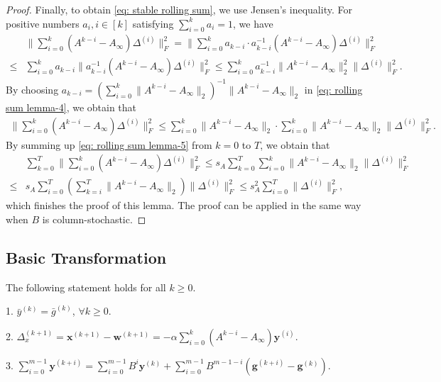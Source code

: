 \documentclass{article}
\newcommand{\vg}{{\mathbf{g}}}
\newcommand{\vw}{{\mathbf{w}}}
\newcommand{\vx}{{\mathbf{x}}}
\newcommand{\vy}{{\mathbf{y}}}
\newcommand{\norm}[1]{\| #1 \|}
\begin{document}
\begin{proof}
Finally, to obtain \eqref{eq: stable rolling sum}, we use Jensen's inequality. For positive numbers $a_i, i\in[k]$ satisfying $\sum_{i=0}^k a_i=1$, we have
\begin{align}\label{eq: rolling sum lemma-4}
     &\norm{\sum_{i=0}^k(A^{k-i}-A_\infty)\Delta^{(i)}}_F^2=\norm{\sum_{i=0}^k a_{k-i}\cdot a_{k-i}^{-1}(A^{k-i}-A_\infty)\Delta^{(i)}}_F^2\nonumber\\
    \le& \sum_{i=0}^k a_{k-i}\norm{a_{k-i}^{-1}(A^{k-i}-A_\infty)\Delta^{(i)}}_F^2\le \sum_{i=0}^k a_{k-i}^{-1}\norm{A^{k-i}-A_\infty}_2^2\norm{\Delta^{(i)}}_F^2.
\end{align}
By choosing $a_{k-i}=(\sum_{i=0}^k\norm{A^{k-i}-A_\infty}_2)^{-1}\norm{A^{k-i}-A_\infty}_2$ in \eqref{eq: rolling sum lemma-4}, we obtain that
\begin{align}\label{eq: rolling sum lemma-5}
    \norm{\sum_{i=0}^k(A^{k-i}-A_\infty)\Delta^{(i)}}_F^2\le \sum_{i=0}^k\norm{A^{k-i}-A_\infty}_2\cdot\sum_{i=0}^k\norm{A^{k-i}-A_\infty}_2\norm{\Delta^{(i)}}_F^2.
\end{align}
By summing up \eqref{eq: rolling sum lemma-5} from $k=0$ to $T$, we obtain that  
\begin{align*}
    &\sum_{k=0}^T\norm{\sum_{i=0}^k(A^{k-i}-A_\infty)\Delta^{(i)}}_F^2 \le s_A\sum_{k=0}^T\sum_{i=0}^k\norm{A^{k-i}-A_\infty}_2\norm{\Delta^{(i)}}_F^2\nonumber\\
    \le& s_A \sum_{i=0}^T(\sum_{k=i}^T\norm{A^{k-i}-A_\infty}_2)\norm{\Delta^{(i)}}_F^2\le s_A^2\sum_{i=0}^T\norm{\Delta^{(i)}}_F^2,
\end{align*}
which finishes the proof of this lemma. The proof can be applied in the same way when $B$ is column-stochastic.
    
\end{proof}


\subsection{Basic Transformation}
The following statement holds for all $k\geq0$.

1. $\bar{y}^{(k)}=\bar{g}^{(k)}$, $\forall k\geq 0$. \label{eq:basic_transformation_1}

2. $\Delta_{x}^{(k+1)}=\vx^{(k+1)}-\vw^{(k+1)}=-\alpha\sum_{i=0}^{k}(A^{k-i}-A_{\infty})\vy^{(i)}$. \label{eq:basic_transformation_2}

3. $\sum_{i=0}^{m-1}\vy^{(k+i)}=\sum_{i=0}^{m-1}B^i\vy^{(k)}+\sum_{i=0}^{m-1}B^{m-1-i}(\vg^{(k+i)}-\vg^{(k)})$. \label{eq:basic_transformation_3}
\end{document}
